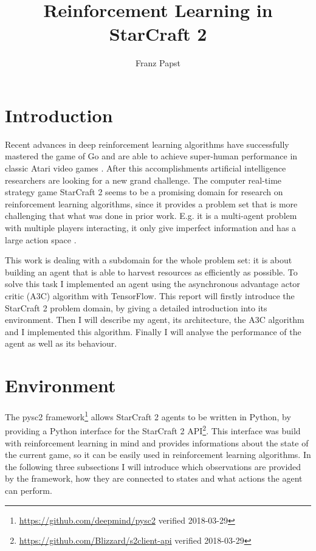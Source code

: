 \documentclass{article}
\title{Reinforcement Learning in StarCraft 2}
\author{Franz Papst}
\begin{document}
\maketitle

\section{Introduction}
Recent advances in deep reinforcement learning algorithms have successfully 
mastered the game of Go \cite{Silver2016} and are able to achieve super-human 
performance in classic Atari video games \cite{Mnih2013}. After this 
accomplishments artificial intelligence researchers are looking for a new grand 
challenge. The computer real-time strategy game StarCraft 2 seems to be a 
promising domain for research on reinforcement learning algorithms, since it 
provides a problem set that is more challenging that what was done in prior 
work. E.g. it is a multi-agent problem with multiple players interacting, it 
only give imperfect information and has a large action space \cite{Vinyals2017}.

This work is dealing with a subdomain for the whole problem set: it is about 
building an agent that is able to harvest resources as efficiently as possible. 
To solve this task I implemented an agent using the asynchronous advantage 
actor critic (A3C) algorithm \cite{Mnih2016} with TensorFlow. This report will 
firstly introduce the StarCraft 2 problem domain, by giving a detailed 
introduction into its environment. Then I will describe my agent, its 
architecture, the A3C algorithm and I implemented this algorithm. Finally I 
will analyse the performance of the agent as well as its behaviour.

\section{Environment}
The pysc2 framework\footnote{\url{https://github.com/deepmind/pysc2} verified 
2018-03-29} allows StarCraft 2 agents to be written in Python, by providing a 
Python interface for the StarCraft 2 
API\footnote{\url{https://github.com/Blizzard/s2client-api} verified 
2018-03-29}. This interface was build with reinforcement learning in mind and 
provides informations about the state of the current game, so it can be easily 
used in reinforcement learning algorithms. In the following three subsections I 
will introduce which observations are provided by the framework, how they are 
connected to states and what actions the agent can perform.
\end{document}
